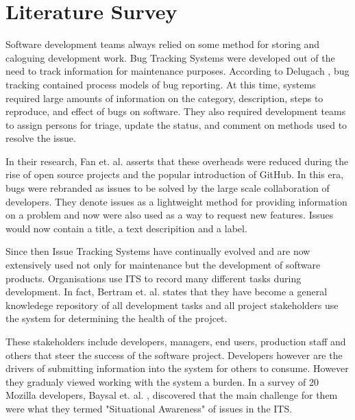 \documentclass{mproj}
\begin{document}


\section{Literature Survey}  %


Software development teams always relied on some method for storing and caloguing development work. Bug Tracking Systems were developed out of the need to track information for maintenance purposes. According to Delugach \cite{Delugach:2007}, bug tracking contained process models of bug reporting. At this time, systems required large amounts of information on the category, description, steps to reproduce, and effect of bugs on software. They also required development teams to assign persons for triage, update the status, and comment on methods used to resolve the issue.

In their research, Fan et. al. \cite{Fan:2017} asserts that these overheads were reduced during the rise of open source projects and the popular introduction of GitHub. In this era, bugs were rebranded as issues to be solved by the large scale collaboration of developers. They denote issues as a lightweight method for providing information on a problem and now were also used as a way to request new features. Issues would now contain a title, a text descripition and a label.

Since then Issue Tracking Systems have continually evolved and are now extensively used not only for maintenance but the development of software products. Organisations use ITS to record many different tasks during development. In fact, Bertram et. al. \cite{Bertram:2010} states that they have become a general knowledege repository of all development tasks and all project stakeholders use the system for determining the health of the projcet.

These stakeholders include developers, managers, end users, production staff and others that steer the success of the software project. Developers however are the drivers of submitting information into the system for others to consume. However they gradualy viewed working with the system a burden. In a survey of 20 Mozilla developers, Baysal et. al. \cite{Baysal:2013}, discovered that the main challenge for them were what they termed "Situational Awareness" of issues in the ITS.
\end{document}
